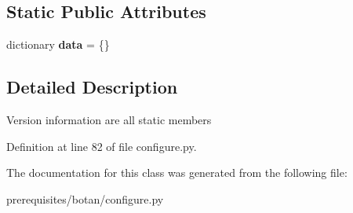\subsection*{Static Public Attributes}
\begin{DoxyCompactItemize}
\item 
\mbox{\label{classconfigure_1_1_version_a35a69f586813e7e8a250e9a36ce9bb63}} 
dictionary {\bfseries data} = \{\}
\end{DoxyCompactItemize}


\subsection{Detailed Description}
\begin{DoxyVerb}Version information are all static members
\end{DoxyVerb}
 

Definition at line 82 of file configure.\+py.



The documentation for this class was generated from the following file\+:\begin{DoxyCompactItemize}
\item 
prerequisites/botan/configure.\+py\end{DoxyCompactItemize}
